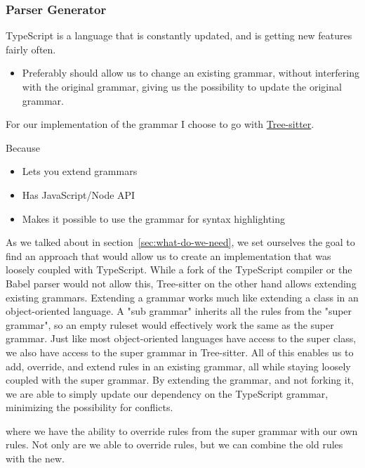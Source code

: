 \subsubsection{Parser Generator}\label{subsubsec:parser-generator}

TypeScript is a language that is constantly updated, and is getting new features fairly often.


\begin{itemize}
    \item Preferably should allow us to change an existing grammar, without interfering with the original grammar, giving us the possibility to update the original grammar.
\end{itemize}

For our implementation of the grammar I choose to go with \href{https://tree-sitter.github.io/tree-sitter/}{Tree-sitter}.

Because
\begin{itemize}
    \item Lets you extend grammars
    \item Has JavaScript/Node API
    \item Makes it possible to use the grammar for syntax highlighting
\end{itemize}


As we talked about in section~\vref{sec:what-do-we-need}, we set ourselves the goal to find an approach that would allow us to create an implementation that was loosely coupled with TypeScript.
While a fork of the TypeScript compiler or the Babel parser would not allow this, Tree-sitter on the other hand allows extending existing grammars.
Extending a grammar works much like extending a class in an object-oriented language.
A "sub grammar" inherits all the rules from the "super grammar", so an empty ruleset would effectively work the same as the super grammar.
Just like most object-oriented languages have access to the super class, we also have access to the super grammar in Tree-sitter.
All of this enables us to add, override, and extend rules in an existing grammar, all while staying loosely coupled with the super grammar.
By extending the grammar, and not forking it, we are able to simply update our dependency on the TypeScript grammar, minimizing the possibility for conflicts.

where we have the ability to override rules from the super grammar with our own rules.
Not only are we able to override rules, but we can combine the old rules with the new.

